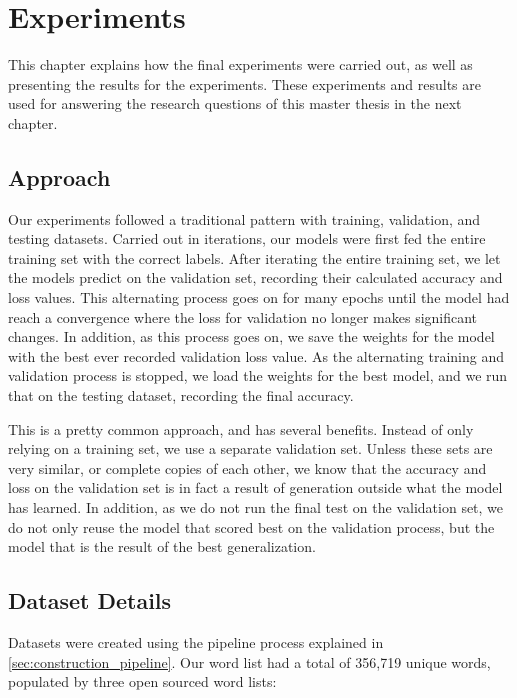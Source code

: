 
\chapter{Experiments}
\label{ch:experiments}
This chapter explains how the final experiments were carried out, as well as presenting the results for the experiments. These experiments and results are used for answering the research questions of this master thesis in the next chapter.


\section{Approach}
Our experiments followed a traditional pattern with training, validation, and testing datasets. Carried out in iterations, our models were first fed the entire training set with the correct labels. After iterating the entire training set, we let the models predict on the validation set, recording their calculated accuracy and loss values. This alternating process goes on for many epochs until the model had reach a convergence where the loss for validation no longer makes significant changes. In addition, as this process goes on, we save the weights for the model with the best ever recorded validation loss value. As the alternating training and validation process is stopped, we load the weights for the best model, and we run that on the testing dataset, recording the final accuracy.

This is a pretty common approach, and has several benefits. Instead of only relying on a training set, we use a separate validation set. Unless these sets are very similar, or complete copies of each other, we know that the accuracy and loss on the validation set is in fact a result of generation outside what the model has learned. In addition, as we do not run the final test on the validation set, we do not only reuse the model that scored best on the validation process, but the model that is the result of the best generalization.


\section{Dataset Details}
Datasets were created using the pipeline process explained in \ref{sec:construction_pipeline}. Our word list had a total of 356,719 unique words, populated by three open sourced word lists:

